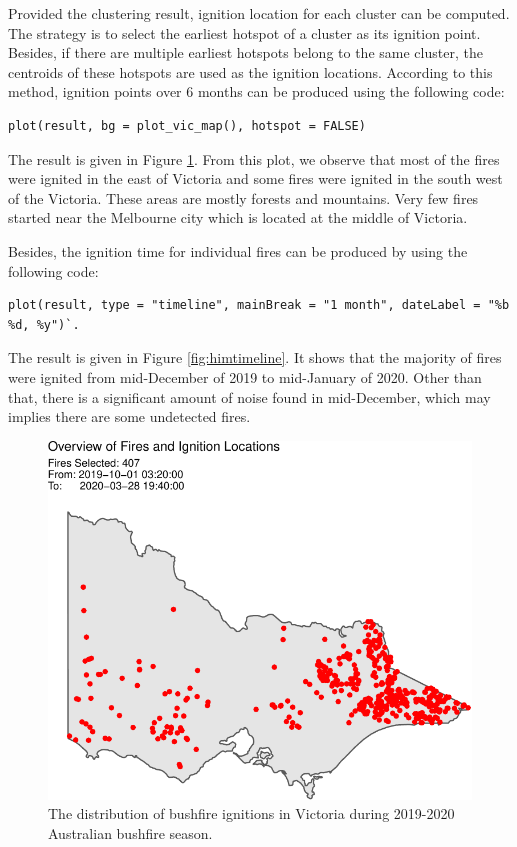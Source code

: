 Provided the clustering result, ignition location for each cluster can
be computed. The strategy is to select the earliest hotspot of a cluster
as its ignition point. Besides, if there are multiple earliest hotspots
belong to the same cluster, the centroids of these hotspots are used as
the ignition locations. According to this method, ignition points over 6
months can be produced using the following code:

\begin{verbatim}
plot(result, bg = plot_vic_map(), hotspot = FALSE)
\end{verbatim}

The result is given in Figure \ref{fig:clusteringfinalresults}. From
this plot, we observe that most of the fires were ignited in the east of
Victoria and some fires were ignited in the south west of the Victoria.
These areas are mostly forests and mountains. Very few fires started
near the Melbourne city which is located at the middle of Victoria.

Besides, the ignition time for individual fires can be produced by using
the following code:

\begin{verbatim}
plot(result, type = "timeline", mainBreak = "1 month", dateLabel = "%b %d, %y")`. 
\end{verbatim}

The result is given in Figure \ref{fig:himtimeline}. It shows that the
majority of fires were ignited from mid-December of 2019 to mid-January
of 2020. Other than that, there is a significant amount of noise found
in mid-December, which may implies there are some undetected fires.

\begin{Schunk}
\begin{figure}

{\centering \includegraphics[width=0.8\linewidth]{clustering_paper_files/figure-latex/clusteringfinalresults-1} 

}

\caption[ The distribution of bushfire ignitions in Victoria during 2019-2020 Australian bushfire season]{ The distribution of bushfire ignitions in Victoria during 2019-2020 Australian bushfire season.}\label{fig:clusteringfinalresults}
\end{figure}
\end{Schunk}

